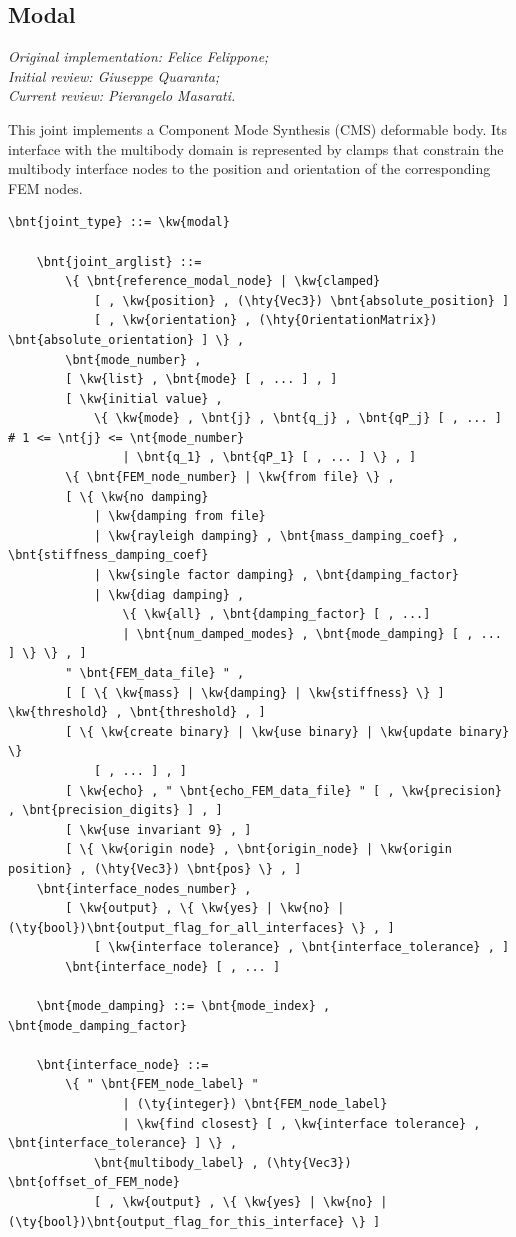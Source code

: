 \subsection{Modal}\label{sec:EL:STRUCT:JOINT:MODAL}\label{sec:ModalJoint}
\emph{
Original implementation: Felice Felippone; \\
Initial review: Giuseppe Quaranta; \\
Current review: Pierangelo Masarati.}

This joint implements a Component Mode Synthesis (CMS) deformable body.
Its interface with the multibody domain is represented by clamps
that constrain the multibody interface nodes to the position
and orientation of the corresponding FEM nodes.
\begin{Verbatim}[commandchars=\\\{\}]
    \bnt{joint_type} ::= \kw{modal}

    \bnt{joint_arglist} ::=
        \{ \bnt{reference_modal_node} | \kw{clamped}
            [ , \kw{position} , (\hty{Vec3}) \bnt{absolute_position} ]
            [ , \kw{orientation} , (\hty{OrientationMatrix}) \bnt{absolute_orientation} ] \} ,
        \bnt{mode_number} ,
        [ \kw{list} , \bnt{mode} [ , ... ] , ]
        [ \kw{initial value} ,
            \{ \kw{mode} , \bnt{j} , \bnt{q_j} , \bnt{qP_j} [ , ... ]  # 1 <= \nt{j} <= \nt{mode_number}
                | \bnt{q_1} , \bnt{qP_1} [ , ... ] \} , ]
        \{ \bnt{FEM_node_number} | \kw{from file} \} ,
        [ \{ \kw{no damping}
            | \kw{damping from file}
            | \kw{rayleigh damping} , \bnt{mass_damping_coef} , \bnt{stiffness_damping_coef}
            | \kw{single factor damping} , \bnt{damping_factor}
            | \kw{diag damping} ,
                \{ \kw{all} , \bnt{damping_factor} [ , ...]
                | \bnt{num_damped_modes} , \bnt{mode_damping} [ , ... ] \} \} , ]
        " \bnt{FEM_data_file} " ,
        [ [ \{ \kw{mass} | \kw{damping} | \kw{stiffness} \} ] \kw{threshold} , \bnt{threshold} , ]
        [ \{ \kw{create binary} | \kw{use binary} | \kw{update binary} \}
            [ , ... ] , ]
        [ \kw{echo} , " \bnt{echo_FEM_data_file} " [ , \kw{precision} , \bnt{precision_digits} ] , ]
        [ \kw{use invariant 9} , ]
        [ \{ \kw{origin node} , \bnt{origin_node} | \kw{origin position} , (\hty{Vec3}) \bnt{pos} \} , ]
	\bnt{interface_nodes_number} ,
	    [ \kw{output} , \{ \kw{yes} | \kw{no} | (\ty{bool})\bnt{output_flag_for_all_interfaces} \} , ]
            [ \kw{interface tolerance} , \bnt{interface_tolerance} , ]
	    \bnt{interface_node} [ , ... ]

    \bnt{mode_damping} ::= \bnt{mode_index} , \bnt{mode_damping_factor}

    \bnt{interface_node} ::=
        \{ " \bnt{FEM_node_label} "
                | (\ty{integer}) \bnt{FEM_node_label}
                | \kw{find closest} [ , \kw{interface tolerance} , \bnt{interface_tolerance} ] \} ,
            \bnt{multibody_label} , (\hty{Vec3}) \bnt{offset_of_FEM_node}
	        [ , \kw{output} , \{ \kw{yes} | \kw{no} | (\ty{bool})\bnt{output_flag_for_this_interface} \} ]
\end{Verbatim}

